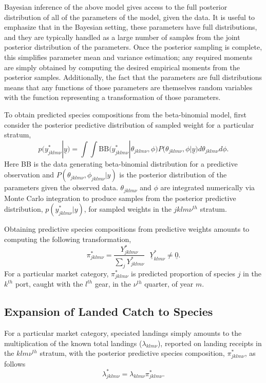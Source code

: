 \documentclass[12pt]{article}
\begin{document}
%
Bayesian inference of the above model gives access to the full posterior 
distribution of all of the parameters of the model, given the data. It is 
useful to emphasize that in the Bayesian setting, these parameters have full 
distributions, and they are typically handled as a large number of samples 
from the joint posterior distribution of the parameters. Once the posterior 
sampling is complete, this simplifies parameter mean and variance estimation; 
any required moments are simply obtained by computing the desired empirical 
moments from the posterior samples. Additionally, the fact that the 
parameters are full distributions means that any functions of those parameters 
are themselves random variables with the function representing a 
transformation of those parameters.

%
To obtain predicted species compositions from the beta-binomial model, first 
consider the posterior predictive distribution of sampled weight for a 
particular stratum,
%
\[p(y^*_{jklm\nu}|\underline{y}) = \int\!\!\!\!\int\! \text{BB}\Big( y^*_{jklm\nu}|\theta_{jklm\nu}, \phi \Big) P\Big(\theta_{jklm\nu}, \phi | \underline{y}\Big) d\theta_{jklm\nu} d\phi.\]
%
Here BB is the data generating beta-binomial distribution for a
predictive observation and \(P(\theta_{jklm\nu}, \phi_{jklm\nu}|y)\)
is the posterior distribution of the parameters given the observed data.
\(\theta_{jklm\nu}\) and \(\phi\) are integrated numerically via 
Monte Carlo integration to produce samples from the posterior predictive 
distribution, \(p(y^*_{jklm\nu}|y)\), for sampled weights in the 
\(jklm\nu^{th}\) stratum.  

%
Obtaining predictive species compositions from predictive weights
amounts to computing the following transformation,
%
\[\pi^*_{jklm\nu} = \frac{Y^*_{jklm\nu}}{\sum_j Y^*_{jklm\nu}} ~~~ \underline{Y}^*_{klm\nu}\neq \underline{0}.\]
%
For a particular market category, \(\pi^*_{jklm\nu}\) is predicted
proportion of species \(j\) in the \(k^{th}\) port, caught with the
\(l^{th}\) gear, in the \(\nu^{th}\) quarter, of year \(m\).

%
%
\subsection{Expansion of Landed Catch to Species}\label{expansion}
%
%

%
For a particular market category, speciated landings simply amounts to
the multiplication of the known total landings (\(\lambda_{klm\nu}\)),
reported on landing receipts in the \(klm\nu^{th}\) stratum, with the
posterior predictive species composition, \(\pi^*_{jklm\nu}\), as follows
%
\[\lambda^*_{jklm\nu} = \lambda_{klm\nu}\pi^*_{jklm\nu}.\]
\end{document}
